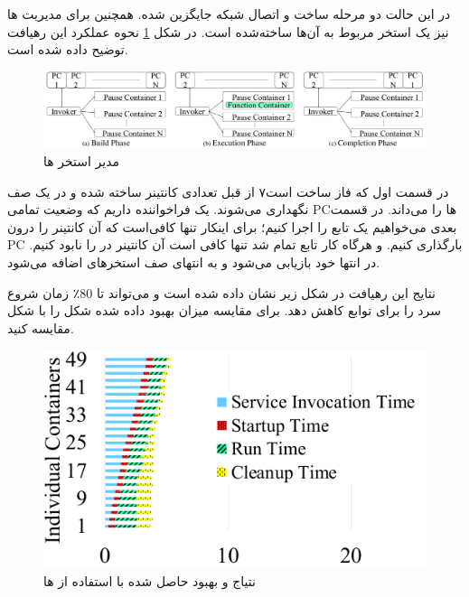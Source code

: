 در این حالت دو مرحله ساخت و اتصال شبکه جایگزین شده. همچنین برای مدیریت  ها نیز یک استخر مربوط به آن‌ها ساخته‌شده است. در شکل \ref{fig:Pause-Container-Pool-Manager} نحوه عملکرد این رهیافت توضیح داده شده است.

\begin{figure}
	\centering
	\includegraphics[width=\linewidth]{figs/Pause-Container-Pool-Manager}
	\caption {مدیر استخر ها}
	\label{fig:Pause-Container-Pool-Manager}
\end{figure}
 
در قسمت اول که فاز ساخت است۷ از قبل تعدادی کانتینر ساخته شده و در یک صف نگهداری می‌شوند. یک فراخواننده داریم که وضعیت تمامی PCها را می‌داند. در قسمت بعدی می‌خواهیم یک تابع را اجرا کنیم؛ برای اینکار تنها کافی‌است که آن کانتینر را درون PC بارگذاری کنیم. و هرگاه کار تابع تمام شد تنها کافی است آن کانتینر در  را نابود کنیم. در انتها خود  بازیابی می‌شود و به انتهای صف استخرهای  اضافه می‌شود. 

نتایج این رهیافت در شکل زیر نشان داده شده است و می‌تواند تا 80٪ زمان شروع سرد را برای توابع کاهش دهد. برای مقایسه میزان بهبود داده شده شکل را با شکل مقایسه کنید.


\begin{figure}
	\centering
	\includegraphics[width=0.8\linewidth]{figs/Pause-Containers-Results}
	\caption {نتیاج و بهبود حاصل شده با استفاده از ها}
	\label{fig:Pause-Containers-Results}
\end{figure}


